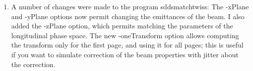 \documentclass[11pt]{article}
\begin{document}
\begin{enumerate}
\item A number of changes were made to the program sddsmatchtwiss: The
-xPlane and -yPlane options now permit changing the emittances of the
beam.  I also added the -zPlane option, which permits matching the
parameters of the longitudinal phase space. The new -oneTransform
option allows computing the transform only for the first page, and
using it for all pages; this is useful if you want to simulate
correction of the beam properties with jitter about the correction.

\end{enumerate}
\end{document}
